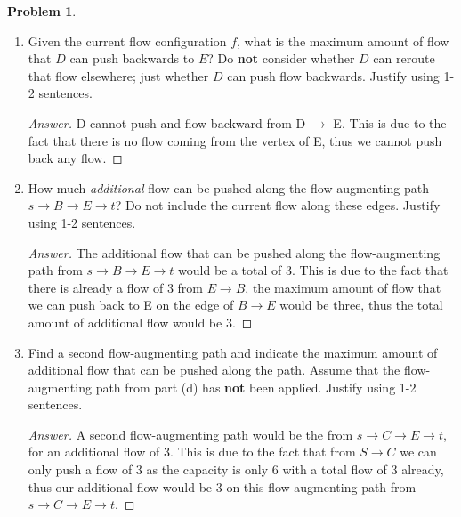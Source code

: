\documentclass[11pt]{article}
\theoremstyle{definition}
\theoremstyle{definition}
\newtheorem{required}{Problem}
\theoremstyle{definition}
\begin{document}
\begin{required}
\begin{enumerate}[label=(\alph*)]
\begin{proof}[Answer]
There is a flow of 3 being pushed back from B $\rightarrow$ E. Since there is a total amount of 3 flow being pushed from E $\rightarrow$ B, the residual amount of flow coming from B $\rightarrow$ E would have a capacity of 0 and a flow of -3 and the flow after some arithmetic would be a total of 3 from B $\rightarrow$ E.
\end{proof}



\vskip 10pt
\item Given the current flow configuration $f$, what is the maximum amount of flow that $D$ can push backwards to $E$? Do \textbf{not} consider whether $D$ can reroute that flow elsewhere; just whether $D$ can push flow backwards. Justify using 1-2 sentences.

\begin{proof}[Answer]
D cannot push and flow backward from D $\rightarrow$ E. This is due to the fact that there is no flow coming from the vertex of E, thus we cannot push back any flow.
\end{proof}


\newpage
\item How much \textit{additional} flow can be pushed along the flow-augmenting path $s \to B \to E \to t$? Do not include the current flow along these edges. Justify using 1-2 sentences.

\begin{proof}[Answer]
The additional flow that can be pushed along the flow-augmenting path from $s \to B \to E \to t$ would be a total of 3. This is due to the fact that there is already a flow of 3 from $E \to B$, the maximum amount of flow that we can push back to E on the edge of $B \to E$ would be three, thus the total amount of additional flow would be 3.
\end{proof}


\vskip 10pt
\item Find a second flow-augmenting path and indicate the maximum amount of additional flow that can be pushed along the path. Assume that the flow-augmenting path from part (d) has \textbf{not} been applied. Justify using 1-2 sentences.

\begin{proof}[Answer]
A second flow-augmenting path would be the from $s \to C \to E \to t$, for an additional flow of 3. This is due to the fact that from $S \to C$ we can only push a flow of 3 as the capacity is only 6 with a total flow of 3 already, thus our additional flow would be 3 on this flow-augmenting path from $s \to C \to E \to t$.
\end{proof}
\end{enumerate}
\end{required}
\end{document}
